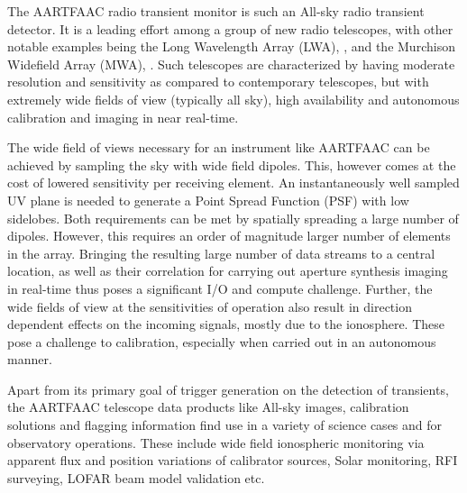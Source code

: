 \documentclass{ws-jai}
\begin{document}

The  AARTFAAC  radio  transient  monitor  is such  an  All-sky  radio  transient
detector.  It is  a leading effort among  a group of new  radio telescopes, with
other   notable    examples   being    the   Long   Wavelength    Array   (LWA),
\cite{ellingsonLWA1},   and  the   Murchison   Widefield   Array  (MWA),   \cite
     {tingay2013murchison}.   Such   telescopes  are  characterized   by  having
     moderate resolution and sensitivity as compared to contemporary telescopes,
     but  with  extremely  wide  fields   of  view  (typically  all  sky),  high
     availability and autonomous calibration and imaging in near real-time.

The  wide field  of  views necessary  for  an instrument  like  AARTFAAC can  be
achieved by sampling the sky with wide field dipoles. This, however comes at the
cost  of lowered  sensitivity per  receiving element.   An instantaneously  well
sampled UV plane  is needed to generate  a Point Spread Function  (PSF) with low
sidelobes.  Both requirements  can be met by spatially spreading  a large number
of  dipoles.  However,  this requires  an order  of magnitude  larger number  of
elements in the array.  Bringing the resulting large number of data streams to a
central  location,  as well  as  their  correlation  for carrying  out  aperture
synthesis  imaging  in  real-time  thus  poses a  significant  I/O  and  compute
challenge. Further,  the wide fields of  view at the sensitivities  of operation
also result in  direction dependent effects on the incoming  signals, mostly due
to  the ionosphere.   These pose  a  challenge to  calibration, especially  when
carried out in an autonomous manner.

Apart  from  its  primary  goal  of  trigger  generation  on  the  detection  of
transients,  the   AARTFAAC  telescope   data  products  like   All-sky  images,
calibration solutions and flagging information find  use in a variety of science
cases  and for  observatory operations.   These include  wide field  ionospheric
monitoring  via apparent  flux and  position variations  of calibrator  sources,
Solar monitoring, RFI surveying, LOFAR beam model validation etc.
\end{document}

